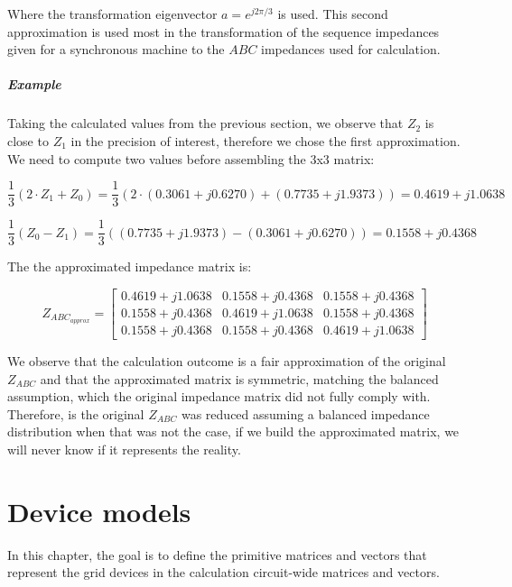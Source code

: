 \documentclass[nols,a4paper,twoside,symmetric,notoc,fleqn]{tufte-book}
\begin{document}
Where the transformation eigenvector $a=e^{j2 \pi / 3}$ is used. This second approximation is used most in the transformation of the sequence impedances given for a synchronous machine to the $ABC$ impedances used for calculation.

\paragraph{Example}
Taking the calculated values from the previous section, we observe that $Z_2$ is close to $Z_1$ in the precision of interest, therefore we chose the first approximation. We need to compute two values before assembling the 3x3 matrix:

$$
\frac{1}{3}(2 \cdot Z_1 + Z_0) = \frac{1}{3} (2\cdot(0.3061 + j 0.6270) + (0.7735 + j 1.9373)) = 0.4619 + j1.0638
$$

$$
\frac{1}{3} (Z_0 - Z_1) = \frac{1}{3}((0.7735 + j 1.9373) - (0.3061 + j 0.6270)) = 0.1558 + j0.4368
$$

The the approximated impedance matrix is:

$$
Z_{ABC_{approx}} = \left[ \begin{array}{ccc}
0.4619 + j1.0638 & 0.1558 + j0.4368 & 0.1558 + j0.4368 \\
0.1558 + j0.4368 & 0.4619 + j1.0638 & 0.1558 + j0.4368 \\ 
0.1558 + j0.4368 & 0.1558 + j0.4368 & 0.4619 + j1.0638
\end{array} \right]
$$

We observe that the calculation outcome is a fair approximation of the original $Z_{ABC}$ and that the approximated matrix is symmetric, matching the balanced assumption, which the original impedance matrix did not fully comply with. Therefore, is the original $Z_{ABC}$ was reduced assuming a balanced impedance distribution when that was not the case, if we build the approximated matrix, we will never know if it represents the reality.






\chapter{Device models} \label{devices}

In this chapter, the goal is to define the primitive matrices and vectors that represent the grid devices in the calculation circuit-wide matrices and vectors.
\end{document}

